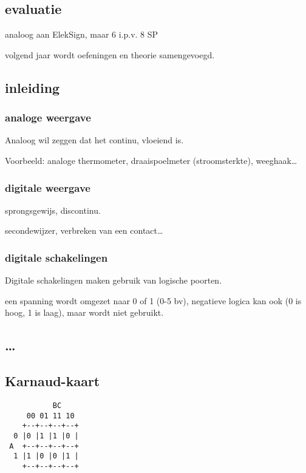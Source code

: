 \documentclass[11pt, a4paper]{article}
\begin{document}
\subsection{evaluatie}

analoog aan ElekSign, maar 6 i.p.v. 8 SP

volgend jaar wordt oefeningen en theorie samengevoegd.

\subsection{inleiding}

\subsubsection{analoge weergave}

Analoog wil zeggen dat het continu, vloeiend is.

Voorbeeld: analoge thermometer, draaispoelmeter (stroomsterkte), weeghaak\dots

\subsubsection{digitale weergave}

sprongsgewijs, discontinu.

secondewijzer, verbreken van een contact\dots

\subsubsection{digitale schakelingen}

Digitale schakelingen maken gebruik van logische poorten.

een spanning wordt omgezet naar 0 of 1 (0-5 bv), negatieve logica kan ook (0 is hoog, 1 is laag), maar wordt niet gebruikt.

\subsection{\dots}

\subsection{Karnaud-kaart}


\begin{verbatim}
    	   BC
     00 01 11 10
    +--+--+--+--+
  0 |0 |1 |1 |0 |
 A  +--+--+--+--+
  1 |1 |0 |0 |1 |
    +--+--+--+--+
\end{verbatim}
\end{document}
